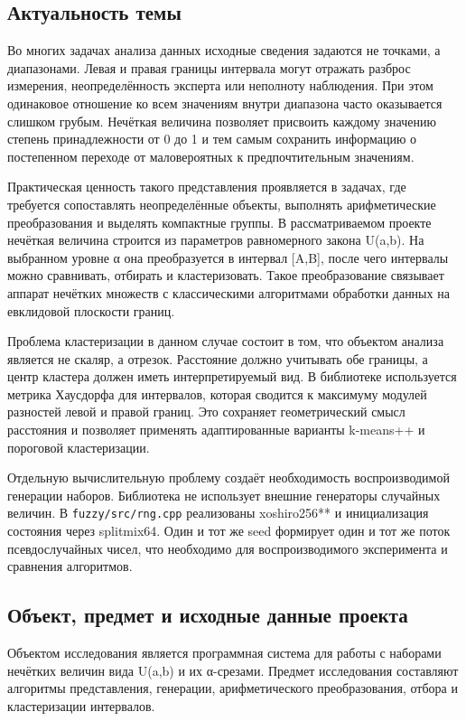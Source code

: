 \subsection{Актуальность темы}

Во многих задачах анализа данных исходные сведения задаются не точками, а диапазонами. Левая и правая границы интервала могут отражать разброс измерения, неопределённость эксперта или неполноту наблюдения. При этом одинаковое отношение ко всем значениям внутри диапазона часто оказывается слишком грубым. Нечёткая величина позволяет присвоить каждому значению степень принадлежности от 0 до 1 и тем самым сохранить информацию о постепенном переходе от маловероятных к предпочтительным значениям.

Практическая ценность такого представления проявляется в задачах, где требуется сопоставлять неопределённые объекты, выполнять арифметические преобразования и выделять компактные группы. В рассматриваемом проекте нечёткая величина строится из параметров равномерного закона U(a,b). На выбранном уровне α она преобразуется в интервал [A,B], после чего интервалы можно сравнивать, отбирать и кластеризовать. Такое преобразование связывает аппарат нечётких множеств с классическими алгоритмами обработки данных на евклидовой плоскости границ.

Проблема кластеризации в данном случае состоит в том, что объектом анализа является не скаляр, а отрезок. Расстояние должно учитывать обе границы, а центр кластера должен иметь интерпретируемый вид. В библиотеке используется метрика Хаусдорфа для интервалов, которая сводится к максимуму модулей разностей левой и правой границ. Это сохраняет геометрический смысл расстояния и позволяет применять адаптированные варианты k-means++ и пороговой кластеризации.

Отдельную вычислительную проблему создаёт необходимость воспроизводимой генерации наборов. Библиотека не использует внешние генераторы случайных величин. В \texttt{fuzzy/src/rng.cpp} реализованы xoshiro256** и инициализация состояния через splitmix64. Один и тот же seed формирует один и тот же поток псевдослучайных чисел, что необходимо для воспроизводимого эксперимента и сравнения алгоритмов.

\subsection{Объект, предмет и исходные данные проекта}

Объектом исследования является программная система для работы с наборами нечётких величин вида U(a,b) и их α-срезами. Предмет исследования составляют алгоритмы представления, генерации, арифметического преобразования, отбора и кластеризации интервалов.

